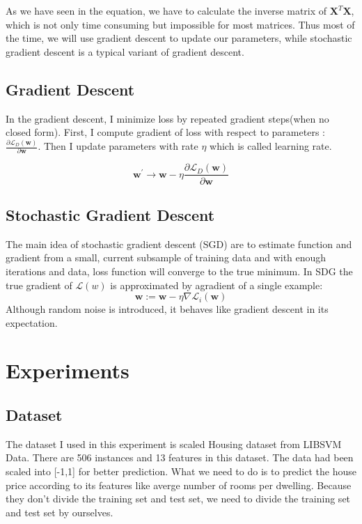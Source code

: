 \documentclass[journal, a4paper]{IEEEtran}
\begin{document}
As we have seen in the equation, we have to calculate the inverse matrix of $\textbf{X}^T\textbf{X}$, which is not only time consuming but impossible for most matrices. Thus most of the time, we will use gradient descent to update our parameters, while stochastic gradient descent is a typical variant of gradient descent.

\subsection{Gradient Descent}
In the gradient descent, I minimize loss by repeated gradient steps(when no closed form). First, I  compute gradient of loss with respect to parameters : $\frac{\partial\mathcal{L}_D(\textbf{w})}{\partial\textbf{w}}$. Then I update parameters with rate $\eta$ which is called learning rate.

\begin{equation}
\textbf{w}^\prime \rightarrow \textbf{w} - \eta\frac{\partial\mathcal{L}_D(\textbf{w})}{\partial\textbf{w}}
\end{equation}

\subsection{Stochastic Gradient Descent}
The main idea of stochastic gradient descent (SGD) are to estimate function and gradient from a small, current subsample of training data and with enough iterations and data, loss function will converge to the true minimum.
In SDG the true gradient of $\mathcal{L}(w)$ is approximated by agradient of a single example:
\begin{equation}
\textbf{w} := \textbf{w} - \eta\nabla\mathcal{L}_i(\textbf{w})
\end{equation}
Although random noise is introduced, it behaves like gradient descent in its expectation.
\section{Experiments}
\subsection{Dataset}

The dataset I used in this experiment is scaled Housing dataset from LIBSVM Data. There are 506 instances and 13 features in this dataset. The data had been scaled into [-1,1] for better prediction. What we need to do is to predict the house price according to its features like averge number of rooms per dwelling. Because they don't divide the training set and test set, we need to divide the training set and test set by ourselves.
\end{document}
